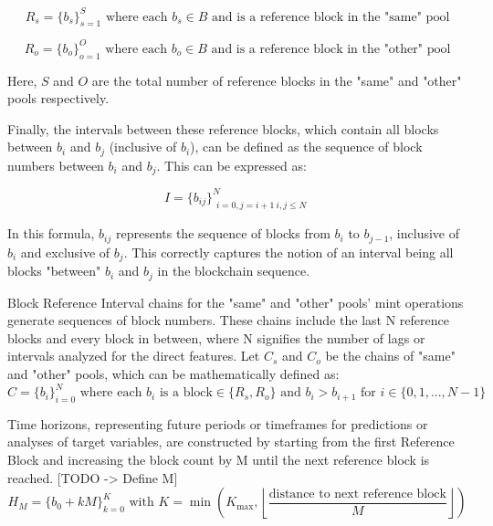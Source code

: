 \documentclass{article}
\begin{document}
\begin{equation}
R_{s} = \{b_{s}\}_{s=1}^{S} \text{ where each } b_{s} \in B \text{ and is a reference block in the "same" pool}
\end{equation}

\begin{equation}
R_{o} = \{b_{o}\}_{o=1}^{O} \text{ where each } b_{o} \in B \text{ and is a reference block in the "other" pool}
\end{equation}

Here, $S$ and $O$ are the total number of reference blocks in the "same" and "other" pools respectively.

Finally, the intervals between these reference blocks, which contain all blocks between $b_i$ and $b_j$ (inclusive of $b_i$), can be defined as the sequence of block numbers between $b_i$ and $b_j$. This can be expressed as:

\begin{equation}
I = \{b_{ij}\}_{\substack{i=0,j=i+1 \ i,j\leq N}}^N
\end{equation}

In this formula, $b_{ij}$ represents the sequence of blocks from $b_i$ to $b_{j-1}$, inclusive of $b_i$ and exclusive of $b_j$. This correctly captures the notion of an interval being all blocks "between" $b_i$ and $b_j$ in the blockchain sequence.

Block Reference Interval chains for the "same" and "other" pools' mint operations generate sequences of block numbers. These chains include the last N reference blocks and every block in between, where N signifies the number of lags or intervals analyzed for the direct features. Let $C_{s}$ and $C_{o}$ be the chains of "same" and "other" pools, which can be mathematically defined as:
\begin{equation}
C = \{b_{i}\}_{i=0}^{N} \text{ where each } b_{i} \text{ is a block} \in \{R_s, R_o\} \text{ and } b_{i} > b_{i+1} \text{ for } i \in \{0,1,...,N-1\}
\end{equation}

Time horizons, representing future periods or timeframes for predictions or analyses of target variables, are constructed by starting from the first Reference Block and increasing the block count by M until the next reference block is reached. 
[TODO -> Define M]
\begin{equation}
H_{M} = \{b_{0}+kM\}_{k=0}^{K} \text{ with } K = \min \left( K_{\text{max}}, \left\lfloor \frac{\text{distance to next reference block}}{M} \right\rfloor \right)
\end{equation}
\end{document}
